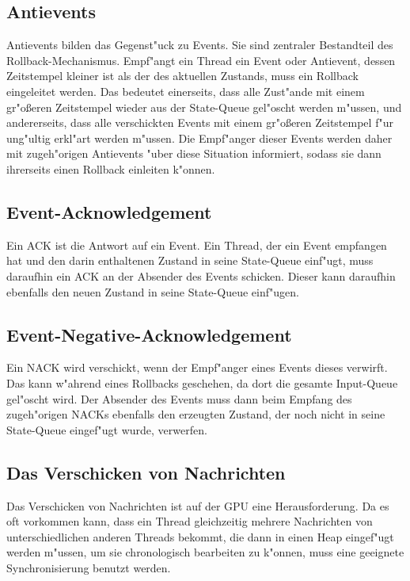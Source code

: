 \documentclass[a4paper, 10pt, openright, parskip, chapterprefix]{scrreprt}
\begin{document}
\subsection{Antievents}
Antievents bilden das Gegenst"uck zu Events. Sie sind zentraler Bestandteil des Rollback-Mechanismus. Empf"angt ein
Thread ein Event oder Antievent, dessen Zeitstempel kleiner ist als der des aktuellen Zustands, muss ein Rollback eingeleitet
werden. Das bedeutet einerseits, dass alle Zust"ande mit einem gr"o\ss eren Zeitstempel wieder aus der State-Queue gel"oscht werden m"ussen, und
andererseits, dass alle verschickten Events mit einem gr"o\ss eren Zeitstempel f"ur ung"ultig erkl"art werden m"ussen.
Die Empf"anger dieser Events werden daher mit
zugeh"origen Antievents "uber diese Situation informiert, sodass sie dann ihrerseits einen Rollback einleiten k"onnen.

\subsection{Event-Acknowledgement}
Ein ACK ist die Antwort auf ein Event. Ein Thread, der ein Event empfangen hat und den darin enthaltenen Zustand in
seine State-Queue einf"ugt, muss daraufhin ein ACK an der Absender des Events schicken. Dieser kann daraufhin
ebenfalls den neuen Zustand in seine State-Queue einf"ugen.

\subsection{Event-Negative-Acknowledgement}
Ein NACK wird verschickt, wenn der Empf"anger eines Events dieses verwirft. Das kann w"ahrend eines Rollbacks geschehen,
da dort die gesamte Input-Queue gel"oscht wird. Der Absender des Events muss dann beim Empfang des zugeh"origen NACKs
ebenfalls den erzeugten Zustand, der noch nicht in seine State-Queue eingef"ugt wurde, verwerfen.

\subsection{Das Verschicken von Nachrichten}
\label{subsec:VerschickenVonNachrichten}
Das Verschicken von Nachrichten ist auf der GPU eine Herausforderung. Da es oft vorkommen kann, dass ein Thread
gleichzeitig mehrere Nachrichten von unterschiedlichen anderen Threads bekommt, die dann in einen Heap eingef"ugt werden
m"ussen, um sie chronologisch bearbeiten zu k"onnen, muss eine geeignete Synchronisierung
benutzt werden. 
\end{document}
